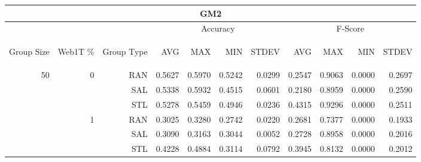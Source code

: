 \begin{center}
\begin{table}[htbp] 
 \begin{center}
\begin{tabular}{ | r | r | r | r | r | r | r | r | r | r | r |}
\hline
\multicolumn{11}{|c|}{GM2}\\
\hline
 & & & \multicolumn{4}{|c|}{Accuracy} & \multicolumn{4}{|c|}{F-Score}\\ \cline{4-11}
\begin{sideways}Group Size\end{sideways} & \begin{sideways}Web1T \%\end{sideways} & \begin{sideways}Group Type\end{sideways} & \begin{sideways}AVG\end{sideways} & \begin{sideways}MAX\end{sideways} & \begin{sideways}MIN\end{sideways} & \begin{sideways}STDEV\end{sideways} & \begin{sideways}AVG\end{sideways} & \begin{sideways}MAX\end{sideways} & \begin{sideways}MIN\end{sideways} & \begin{sideways}STDEV\end{sideways}\\
\hline
\multirow{18}{*}{50}
 & \multirow{3}{*}{0} & RAN & 0.5627 & 0.5970 & 0.5242 & 0.0299 & 0.2547 & 0.9063 & 0.0000 & 0.2697\\ \cline{3-11}
 &   & SAL & 0.5338 & 0.5932 & 0.4515 & 0.0601 & 0.2180 & 0.8959 & 0.0000 & 0.2590\\ \cline{3-11}
 &   & STL & 0.5278 & 0.5459 & 0.4946 & 0.0236 & 0.4315 & 0.9296 & 0.0000 & 0.2511\\ \cline{2-11}
 & \multirow{3}{*}{1} & RAN & 0.3025 & 0.3280 & 0.2742 & 0.0220 & 0.2681 & 0.7377 & 0.0000 & 0.1933\\ \cline{3-11}
 &   & SAL & 0.3090 & 0.3163 & 0.3044 & 0.0052 & 0.2728 & 0.8958 & 0.0000 & 0.2016\\ \cline{3-11}
 &   & STL & 0.4228 & 0.4884 & 0.3114 & 0.0792 & 0.3945 & 0.8132 & 0.0000 & 0.2012\\ \cline{2-11}

\end{tabular}
\end{center}
\end{table}
\end{center}

